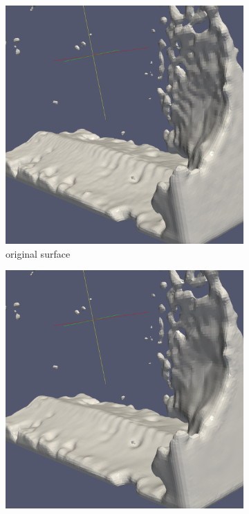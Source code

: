\begin{figure}
	\begin{center}
		\begin{subfigure}[b]{0.47\textwidth}
			\includegraphics[width=\textwidth]{figures/MlsSurfaceInitial.png}
			\caption{original surface}
		\end{subfigure}
		\begin{subfigure}[b]{0.47\textwidth}
			\includegraphics[width=\textwidth]{figures/MlsSurface1Iteration.png}

\end{subfigure}
\end{center}
\end{figure}
